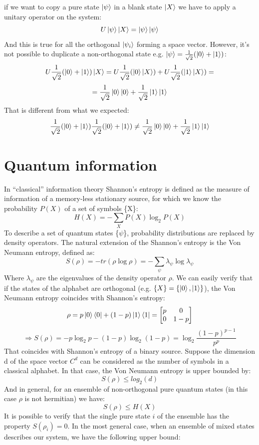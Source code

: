\documentclass[journal, letterpaper]{IEEEtran}
\begin{document}
if we want to copy a pure state $\ket{\psi}$ in a blank state $\ket{X}$ we have to apply a unitary operator on the system: 
\[U\ket{\psi}\ket{X} = \ket{\psi}\ket{\psi} \]
And this is true for all the orthogonal $\ket{\psi_i}$ forming a space vector. However, it's not possible to duplicate a non-orthogonal state \cite{clone} e.g. $\ket{\psi} = \frac{1}{\sqrt{2}}(\ket{0}+\ket{1})$: 
\[U\frac{1}{\sqrt{2}}(\ket{0}+\ket{1})\ket{X} = U\frac{1}{\sqrt{2}}(\ket{0}\ket{X}) + U\frac{1}{\sqrt{2}}(\ket{1}\ket{X}) = \] \[=\frac{1}{\sqrt{2}}\ket{0}\ket{0} +\frac{1}{\sqrt{2}}\ket{1}\ket{1}\]
That is different from what we expected: 
\[ \frac{1}{\sqrt{2}}{(\ket{0}+\ket{1})\frac{1}{\sqrt{2}}}(\ket{0}+\ket{1}) \neq  \frac{1}{\sqrt{2}}\ket{0}\ket{0} +\frac{1}{\sqrt{2}}\ket{1}\ket{1}\]
\section{Quantum information}
In “classical” information theory Shannon’s entropy is defined as the measure of information of a memory-less stationary source, for which we know the probability $P(X)$ of a set of symbols \{X\}: \[H(X) = - \sum_{X} P(X)\log_2P(X)\]
To describe a set of quantum states \{$\psi$\}, probability distributions are replaced by density operators. The natural extension of the Shannon’s entropy is the Von Neumann entropy, defined as:
\[S(\rho) = -tr(\rho \log\rho) = -\sum_{\psi} \lambda_{\psi}\log\lambda_{\psi} \]
Where $\lambda_{\psi}$ are the eigenvalues of the density operator $\rho$. 
We can easily verify that if the states of the alphabet are orthogonal (e.g. $\{X\} = \{\ket{0},\ket{1}\}$), the Von Neumann entropy coincides with Shannon's entropy: 
\[\rho = p\ket{0}\bra{0} + (1-p)\ket{1}\bra{1} = \begin{bmatrix}
    p & 0 \\
    0 & 1-p
\end{bmatrix}\]
\[\Rightarrow S(\rho) = -p\log_2p -(1-p)\log_2(1-p) = \log_2\frac{(1-p)^{p-1}}{p^p} \]
That coincides with Shannon's entropy of a binary source. Suppose the dimension d of the space vector $C^d$ can be considered as the number of symbols in a classical alphabet. In that case, the Von Neumann entropy is upper bounded by: \[S(\rho) \le log_2(d) \] And in general, for an ensemble of non-orthogonal pure quantum states (in this case $\rho$ is not hermitian) we have: \[S(\rho) \le H(X)\] It is possible to verify that the single pure state $i$ of the ensemble has the property $S(\rho_i) = 0$. In the most general case, when an ensemble of mixed states describes our system, we have the following upper bound: 
\end{document}
